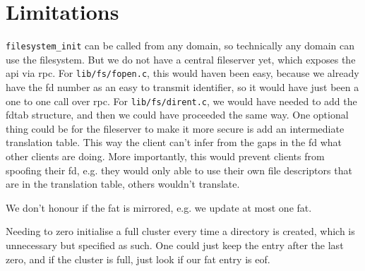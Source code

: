 % 

\section{Limitations}

\verb|filesystem_init| can be called from any domain, so technically any domain
can use the filesystem. But we do not have a central fileserver yet, which
exposes the api via rpc. For \verb|lib/fs/fopen.c|, this would haven been easy,
because we already have the fd number as an easy to transmit identifier, so it
would have just been a one to one call over rpc.
For \verb|lib/fs/dirent.c|, we would have needed to add the fdtab structure, and
then we could have proceeded the same way.
One optional thing could be for the fileserver to make it more secure is add an
intermediate translation table.
This way the client can't infer from the gaps in the fd what other clients are
doing.
More importantly, this would prevent clients from spoofing their fd, e.g. they
would only able to use their own file descriptors that are in the translation
table, others wouldn't translate.

We don't honour if the fat is mirrored, e.g. we update at most one fat.

Needing to zero initialise a full cluster every time a directory is created,
which is unnecessary but specified as such.
One could just keep the entry after the last zero, and if the cluster is full,
just look if our fat entry is eof.

